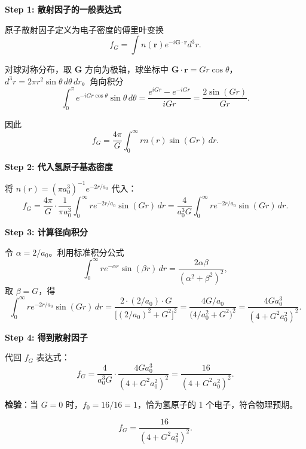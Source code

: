 \begin{derivationbox}[标准解题过程]
\textbf{Step 1: 散射因子的一般表达式}

原子散射因子定义为电子密度的傅里叶变换
\begin{equation}
f_G=\int n(\bm{r})e^{-i\bm{G}\cdot\bm{r}}d^3r.
\end{equation}

对球对称分布，取 $\bm{G}$ 方向为极轴，球坐标中 $\bm{G}\cdot\bm{r}=Gr\cos\theta$，$d^3r=2\pi r^2\sin\theta\,d\theta\,dr$。角向积分
\begin{equation}
\int_0^\pi e^{-iGr\cos\theta}\sin\theta\,d\theta
=\frac{e^{iGr}-e^{-iGr}}{iGr}=\frac{2\sin(Gr)}{Gr}.
\end{equation}

因此
\begin{equation}
f_G=\frac{4\pi}{G}\int_0^\infty rn(r)\sin(Gr)\,dr.
\end{equation}

\textbf{Step 2: 代入氢原子基态密度}

将 $n(r)=(\pi a_0^3)^{-1}e^{-2r/a_0}$ 代入：
\begin{equation}
f_G=\frac{4\pi}{G}\cdot\frac{1}{\pi a_0^3}\int_0^\infty re^{-2r/a_0}\sin(Gr)\,dr
=\frac{4}{a_0^3G}\int_0^\infty re^{-2r/a_0}\sin(Gr)\,dr.
\end{equation}

\textbf{Step 3: 计算径向积分}

令 $\alpha=2/a_0$。利用标准积分公式
\begin{equation}
\int_0^\infty re^{-\alpha r}\sin(\beta r)\,dr=\frac{2\alpha\beta}{(\alpha^2+\beta^2)^2},
\end{equation}
取 $\beta=G$，得
\begin{equation}
\int_0^\infty re^{-2r/a_0}\sin(Gr)\,dr
=\frac{2\cdot(2/a_0)\cdot G}{\bigl[(2/a_0)^2+G^2\bigr]^2}
=\frac{4G/a_0}{\bigl(4/a_0^2+G^2\bigr)^2}
=\frac{4Ga_0^3}{(4+G^2a_0^2)^2}.
\end{equation}

\textbf{Step 4: 得到散射因子}

代回 $f_G$ 表达式：
\begin{equation}
f_G=\frac{4}{a_0^3G}\cdot\frac{4Ga_0^3}{(4+G^2a_0^2)^2}
=\boxed{\frac{16}{(4+G^2a_0^2)^2}.}
\end{equation}

\textbf{检验}：当 $G=0$ 时，$f_0=16/16=1$，恰为氢原子的 1 个电子，符合物理预期。
\end{derivationbox}

\begin{formulabox}[答案汇总]
\begin{equation}
\boxed{f_G=\frac{16}{(4+G^2a_0^2)^2}.}
\end{equation}
\end{formulabox}

